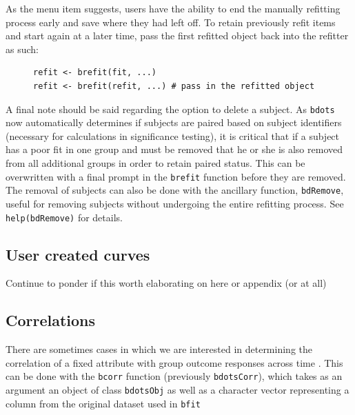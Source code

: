 \documentclass{article}
\newcommand{\xt}{\texttt}%
\begin{document}
As the menu item suggests, users have the ability to end the manually refitting process early and save where they had left off. To retain previously refit items and start again at a later time, pass the first refitted object back into the refitter as such:

\begin{singlespace}
\begin{figure}[H]
\centering
\begin{BVerbatim}
refit <- brefit(fit, ...)
refit <- brefit(refit, ...) # pass in the refitted object
\end{BVerbatim}
\end{figure}
\end{singlespace}



A final note should be said regarding the option to delete a subject. As \xt{bdots} now automatically determines if subjects are paired based on subject identifiers (necessary for  calculations in significance testing), it is critical that if a subject has a poor fit in one group and must be removed that he or she is also removed from all additional groups in order to retain paired status. This can be overwritten with a final prompt in the \texttt{brefit} function before they are removed. The removal of subjects can also be done with the ancillary function, \texttt{bdRemove}, useful for removing subjects without undergoing the entire refitting process. See \xt{help(bdRemove)} for details.


\subsection{User created curves}

Continue to ponder if this worth elaborating on here or appendix (or at all)

\subsection{Correlations}

There are sometimes cases in which we are interested in determining the correlation of a fixed attribute with group outcome responses across time . This can be done with the \texttt{bcorr} function (previously \texttt{bdotsCorr}), which takes as an argument an object of class \texttt{bdotsObj} as well as a character vector representing a column from the original dataset used in \texttt{bfit}
\end{document}

